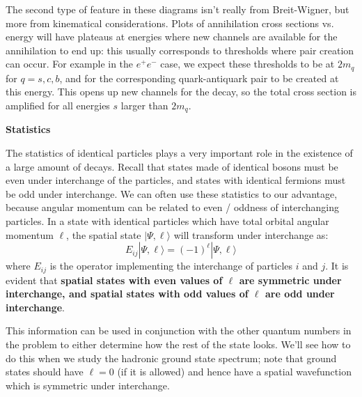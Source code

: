 \documentclass[11pt, oneside]{article}   	%
\theoremstyle{definition}
\numberwithin{equation}{subsection}		%
\newenvironment{answer}{\begin{center}\begin{answerbox}}{\end{answerbox}\end{center}}
\begin{document}
\begin{itemize}
The second type of feature in these diagrams isn't really from Breit-Wigner, but more from kinematical considerations. Plots of annihilation 
cross sections vs. energy will have plateaus at energies where new channels are available for the annihilation to end up: this usually corresponds 
to thresholds where pair creation can occur. For example in the $e^+ e^-$ case, we expect these thresholds to be at $2 m_q$ for $q = s, c, b$, 
and for the corresponding quark-antiquark pair to be created at this energy. This opens up new channels for the decay, so the total cross section 
is amplified for all energies $s$ larger than $2 m_q$. 


\end{itemize}

\begin{answer}
\textbf{Statistics} 

\begin{flushleft} \setlength{\parindent}{2em}
	The statistics of identical particles plays a very important role in the existence of a large amount of decays. Recall that 
	states made of identical bosons must be even under interchange of the particles, and states with identical fermions 
	must be odd under interchange. We can often use these statistics to our advantage, because angular momentum can 
	be related to even / oddness of interchanging particles. In a state with identical particles which have total orbital angular 
	momentum $\ell$, the spatial state $|\Psi, \ell\rangle$ will transform under interchange as:
	\begin{equation}
		E_{ij} |\Psi, \ell\rangle = (-1)^\ell |\Psi, \ell\rangle
	\end{equation}
	where $E_{ij}$ is the operator implementing the interchange of particles $i$ and $j$. It is evident that \textbf{spatial states with 
	even values of $\ell$ are symmetric under interchange, and spatial states with odd values of $\ell$ are odd under interchange}. 
	
	This information can be used in conjunction with the other quantum numbers in the problem to either determine how the rest of 
	the state looks. We'll see how to do this when we study the hadronic ground state spectrum; note that ground states should 
	have $\ell = 0$ (if it is allowed) and hence have a spatial wavefunction which is symmetric under interchange.
	

\end{flushleft}
\end{answer}
\end{document}
